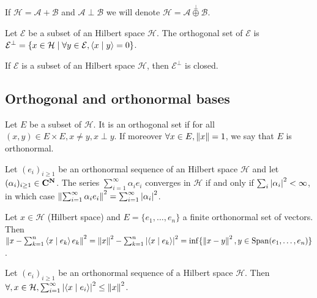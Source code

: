 \begin{note}
	If $\mathcal{H} = \mathcal{A} + \mathcal{B}$ and $\mathcal{A} \perp \mathcal{B}$ we will denote $\mathcal{H} = \mathcal{A} \overset{\perp}{\oplus} \mathcal{B}$.
\end{note}

\begin{defn}
	Let $\mathcal{E}$ be a subset of an Hilbert space $\mathcal{H}$.
	The orthogonal set of $\mathcal{E}$ is $\mathcal{E}^\perp = \{ x \in \mathcal{H} \mid \forall y \in \mathcal{E}, \left\langle x \mid y \right\rangle = 0 \}$.
\end{defn}

\begin{thm}
	If $\mathcal{E}$ is a subset of an Hilbert space $\mathcal{H}$, then $\mathcal{E}^{\perp}$ is closed.
\end{thm}


\subsection{Orthogonal and orthonormal bases}

	\begin{defn}
		Let $E$ be a subset of $\mathcal{H}$.
		It is an orthogonal set if for all $(x,y) \in E \times E, x \neq y, x \perp y$.
		If moreover $\forall x \in E, \left\lVert x\right\rVert = 1$, we say that $E$ is orthonormal.
	\end{defn}

	\begin{thm}
		Let $(e_{i})_{i \geq 1}$ be an orthonormal sequence of an Hilbert space $\mathcal{H}$ and let $(\alpha_{i})_{i \geq 1} \in \mathbf{C}^{\mathbf{N}}$.
		The series $\sum_{i = 1}^\infty \alpha_i e_i$ converges in $\mathcal{H}$ if and only if $\sum_i \left\lvert\alpha_i\right\rvert^2 < \infty$, in which case $\left\lVert\sum_{i = 1}^\infty \alpha_i e_i\right\rVert^2 = \sum_{i = 1}^\infty \left\lvert\alpha_i\right\rvert^2$.
	\end{thm}

	\begin{pop}
		Let $x \in \mathcal{H}$ (Hilbert space) and $E = \{ e_1, \ldots, e_n \}$ a finite orthonormal set of vectors.
		Then $\left\lVert x - \sum_{k = 1}^n \left\langle x \mid e_k \right\rangle e_k\right\rVert^2
			= \left\lVert x\right\rVert^2 - \sum_{k = 1}^n \left\lvert\left\langle x \mid e_k \right\rangle\right\rvert^2
			= \inf \{ \left\lVert x - y\right\rVert^2, y \in \operatorname{Span}(e_1, \ldots, e_n) \}$.
	\end{pop}

	\begin{cor}
		Let $(e_i)_{i \geq 1}$ be an orthonormal sequence of a Hilbert space $\mathcal{H}$.
		Then$\forall, x \in \mathcal{H}, \sum_{i = 1}^\infty \left\lvert\left\langle x \mid e_i \right\rangle\right\rvert^2 \leq \left\lVert x\right\rVert^2$.
	\end{cor}

